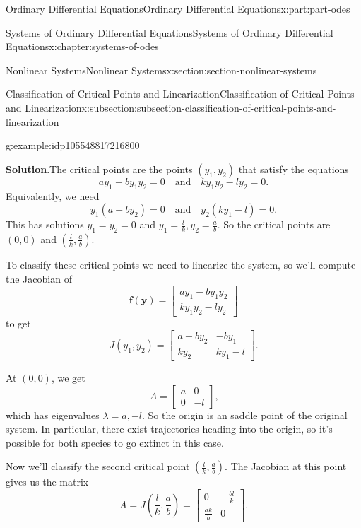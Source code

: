 \documentclass[twoside,10pt,]{book}
\newcommand{\blocktitlefont}{\relax}
\numberwithin{equation}{part}
\renewcommand{\vec}[1]{\mathbf{#1}}
\newcommand{\amp}{&}
\begin{document}
\begin{partptx}{Ordinary Differential Equations}{}{Ordinary Differential Equations}{}{}{x:part:part-odes}
\begin{chapterptx}{Systems of Ordinary Differential Equations}{}{Systems of Ordinary Differential Equations}{}{}{x:chapter:systems-of-odes}
\begin{sectionptx}{Nonlinear Systems}{}{Nonlinear Systems}{}{}{x:section:section-nonlinear-systems}
\begin{subsectionptx}{Classification of Critical Points and Linearization}{}{Classification of Critical Points and Linearization}{}{}{x:subsection:subsection-classification-of-critical-points-and-linearization}
\begin{example}{}{g:example:idp105548817216800}
\par\smallskip%
\noindent\textbf{\blocktitlefont Solution}.\hypertarget{g:solution:idp105548817220000}{}\quad{}The critical points are the points \((y_{1},y_{2})\) that satisfy the equations%
\begin{equation*}
ay_{1}-by_{1}y_{2} = 0\quad\text{and}\quad ky_{1}y_{2} - ly_{2} = 0.
\end{equation*}
Equivalently, we need%
\begin{equation*}
y_{1}(a-by_{2}) = 0\quad\text{and}\quad y_{2}(ky_{1}-l) = 0.
\end{equation*}
This has solutions \(y_{1} = y_{2} = 0\) and \(y_{1} = \frac{l}{k},y_{2} = \frac{a}{b}\). So the critical points are \((0,0)\) and \((\frac{l}{k},\frac{a}{b})\).%
\par
To classify these critical points we need to linearize the system, so we'll compute the Jacobian of%
\begin{equation*}
\vec{f}(\vec{y}) = \begin{bmatrix}ay_{1}-by_{1}y_{2} \\ ky_{1}y_{2} - ly_{2}\end{bmatrix}
\end{equation*}
to get%
\begin{equation*}
J(y_{1},y_{2}) = \begin{bmatrix}a-by_{2} \amp  -by_{1} \\ ky_{2} \amp  ky_{1} - l\end{bmatrix}.
\end{equation*}
%
\par
At \((0,0)\), we get%
\begin{equation*}
A = \begin{bmatrix}a \amp  0 \\ 0 \amp  -l\end{bmatrix}\text{,}
\end{equation*}
which has eigenvalues \(\lambda=a,-l\). So the origin is an saddle point of the original system. In particular, there exist trajectories heading into the origin, so it's possible for both species to go extinct in this case.%
\par
Now we'll classify the second critical point \((\frac{l}{k},\frac{a}{b})\). The Jacobian at this point gives us the matrix%
\begin{equation*}
A = J(\frac{l}{k},\frac{a}{b}) = \begin{bmatrix}0 \amp  -\frac{bl}{k} \\ \frac{ak}{b} \amp  0\end{bmatrix}\text{.}

\end{equation*}
\end{example}
\end{subsectionptx}
\end{sectionptx}
\end{chapterptx}
\end{partptx}
\end{document}
